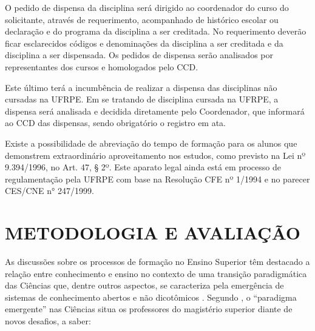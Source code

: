 \documentclass[
	12pt,				%
	openright,			%
  oneside,     %
	a4paper,			%
	chapter=TITLE,		%
	english,			%
	french,				%
	spanish,			%
	brazil				%
	]{abntex2}
\begin{document}
O pedido de dispensa da disciplina será dirigido ao coordenador do curso do solicitante, através de requerimento, acompanhado de histórico escolar ou declaração e do programa da disciplina a ser creditada. No requerimento deverão ficar esclarecidos códigos e denominações da disciplina a ser creditada e da disciplina a ser dispensada. Os pedidos de dispensa serão analisados por representantes dos cursos e homologados pelo CCD.

Este último terá a incumbência de realizar a dispensa das disciplinas não cursadas na UFRPE. Em se tratando de disciplina cursada na UFRPE, a dispensa será analisada e decidida diretamente pelo Coordenador, que informará ao CCD das dispensas, sendo obrigatório o registro em ata.

Existe a possibilidade de abreviação do tempo de formação para os alunos que demonstrem extraordinário aproveitamento nos estudos, como previsto na Lei nº 9.394/1996, no Art. 47, § 2º. Este aparato legal ainda está em processo de regulamentação pela UFRPE com base na Resolução CFE nº 1/1994 e no parecer CES/CNE n° 247/1999.





%
%




\chapter{METODOLOGIA E AVALIAÇÃO}
\label{cap_metodologia_e_avaliacao}

As discussões sobre os processos de formação no Ensino Superior têm destacado a relação entre conhecimento e ensino no contexto de uma transição paradigmática das Ciências que, dentre outros aspectos, se caracteriza pela emergência de sistemas de conhecimento abertos e não dicotômicos \cite{santos1988discurso}. Segundo , o “paradigma emergente” nas Ciências situa os professores do magistério superior diante de novos desafios, a saber:
\end{document}
